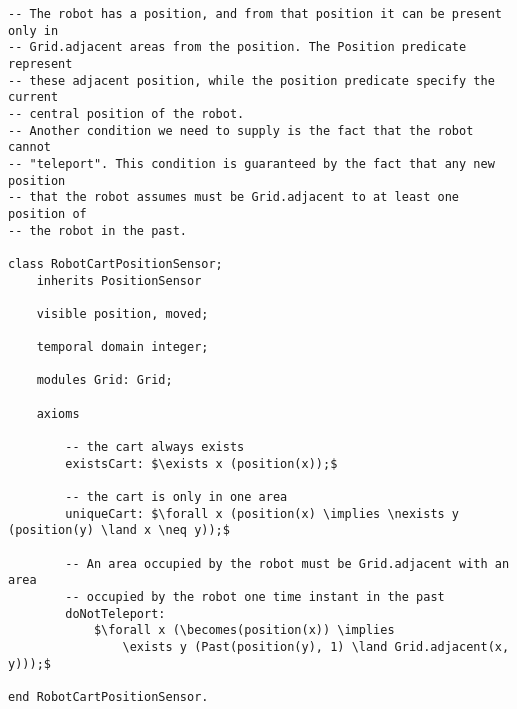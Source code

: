 \begin{lstlisting}[fontadjust, mathescape, frame=single] 
-- The robot has a position, and from that position it can be present only in
-- Grid.adjacent areas from the position. The Position predicate represent 
-- these adjacent position, while the position predicate specify the current 
-- central position of the robot.
-- Another condition we need to supply is the fact that the robot cannot 
-- "teleport". This condition is guaranteed by the fact that any new position
-- that the robot assumes must be Grid.adjacent to at least one position of 
-- the robot in the past.

class RobotCartPositionSensor; 
    inherits PositionSensor
    
    visible position, moved;
    
    temporal domain integer;

    modules Grid: Grid;
    
    axioms
    
        -- the cart always exists
        existsCart: $\exists x (position(x));$

        -- the cart is only in one area
        uniqueCart: $\forall x (position(x) \implies \nexists y (position(y) \land x \neq y));$         

        -- An area occupied by the robot must be Grid.adjacent with an area
        -- occupied by the robot one time instant in the past
        doNotTeleport:
            $\forall x (\becomes(position(x)) \implies 
                \exists y (Past(position(y), 1) \land Grid.adjacent(x, y)));$
            
end RobotCartPositionSensor.
\end{lstlisting}